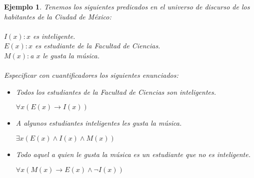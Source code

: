 \documentclass[letterpaper,12pt]{article}
\newtheorem{ejem}{Ejemplo}[]
\begin{document}
    \begin{ejem}
      Tenemos los siguientes predicados en el universo de discurso de los 
      habitantes de la Ciudad de México: \\ \\
      $I(x) : x$ es inteligente. \\
      $E(x) : x$ es estudiante de la Facultad de Ciencias. \\
      $M(x) : $a $x$ le gusta la música. \\ \\
      Especificar con cuantificadores los siguientes enunciados:
      \begin{itemize}
        \item Todos los estudiantes de la Facultad de Ciencias son inteligentes.
        \begin{center}
          $\forall x (E(x) \rightarrow I(x))$
        \end{center}
        \item A algunos estudiantes inteligentes les gusta la música.
        \begin{center}
          $\exists x (E(x) \land I(x) \land M(x))$
        \end{center}
        \item Todo aquel a quien le gusta la música es un estudiante que no es 
        inteligente.
        \begin{center}
          $\forall x (M(x) \rightarrow E(x) \land \neg I(x))$
        \end{center}
      \end{itemize}
    \end{ejem}
\end{document}
